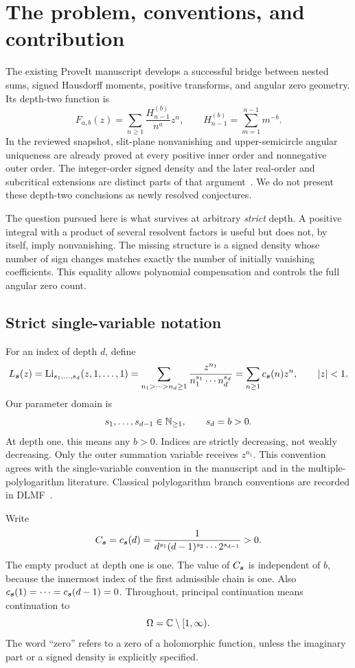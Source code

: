 \section{The problem, conventions, and contribution}
\label{ado:sec:scope}
The existing ProveIt manuscript develops a successful bridge between
nested sums, signed Hausdorff moments, positive transforms, and angular
zero geometry. Its depth-two function is
\[
 F_{a,b}(z)=\sum_{n\ge1}\frac{H_{n-1}^{(b)}}{n^a}z^n,
 \qquad H_{n-1}^{(b)}=\sum_{m=1}^{n-1}m^{-b}.
\]
In the reviewed snapshot, slit-plane nonvanishing and upper-semicircle
angular uniqueness are already proved at every positive inner order and
nonnegative outer order. The integer-order signed density and the later
real-order and subcritical extensions are distinct parts of that
argument~\cite{repoSigned,repoReal,repoSubcritical}. We do not present
these depth-two conclusions as newly resolved conjectures.

The question pursued here is what survives at arbitrary \emph{strict}
depth. A positive integral with a product of several resolvent factors
is useful but does not, by itself, imply nonvanishing. The missing
structure is a signed density whose number of sign changes matches
exactly the number of initially vanishing coefficients. This equality
allows polynomial compensation and controls the full angular zero count.

\subsection{Strict single-variable notation}
For an index of depth $d$, define
\begin{equation}\label{ado:eq:series}
 L_{\boldsymbol{s}}(z)=\operatorname{Li}_{s_1,\ldots,s_d}(z,1,\ldots,1)
 =\sum_{n_1>\cdots>n_d\ge1}
       \frac{z^{n_1}}{n_1^{s_1}\cdots n_d^{s_d}}
 =\sum_{n\ge1}c_{\boldsymbol{s}}(n)z^n,\qquad |z|<1.
\end{equation}
Our parameter domain is
\begin{equation}\label{ado:eq:domain}
 s_1,\ldots,s_{d-1}\in\mathbb N_{\ge1},\qquad s_d=b>0.
\end{equation}
At depth one, this means any $b>0$. Indices are strictly decreasing, not
weakly decreasing. Only the outer summation variable receives $z^{n_1}$.
This convention agrees with the single-variable convention in the
manuscript and in the multiple-polylogarithm literature. Classical
polylogarithm branch conventions are recorded in DLMF~\cite{DLMF}.

Write
\begin{equation}\label{ado:eq:leading}
 C_{\boldsymbol{s}}=c_{\boldsymbol{s}}(d)
 =\frac{1}{d^{s_1}(d-1)^{s_2}\cdots 2^{s_{d-1}}}>0.
\end{equation}
The empty product at depth one is one. The value of $C_{\boldsymbol{s}}$ is
independent of $b$, because the innermost index of the first admissible
chain is one. Also $c_{\boldsymbol{s}}(1)=\cdots=c_{\boldsymbol{s}}(d-1)=0$.
Throughout, principal continuation means continuation to
\[
 \Omega=\mathbb C\setminus[1,\infty).
\]
The word ``zero'' refers to a zero of a holomorphic function, unless the
imaginary part or a signed density is explicitly specified.

